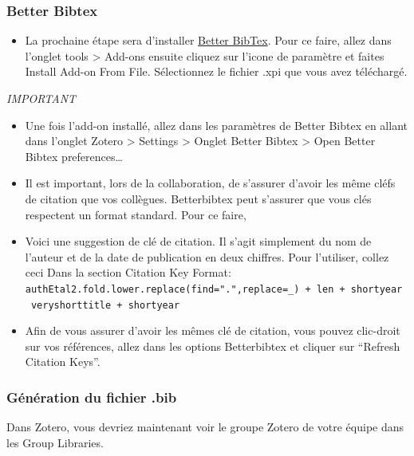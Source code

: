 \documentclass[
  letterpaper,
]{scrbook}
\providecommand{\tightlist}{%
  \setlength{\itemsep}{0pt}\setlength{\parskip}{0pt}}\usepackage{longtable,booktabs,array}
\begin{document}
\hypertarget{better-bibtex}{%
\subsubsection{Better Bibtex}\label{better-bibtex}}

\begin{itemize}
\tightlist
\item
  La prochaine étape sera d'installer
  \href{https://retorque.re/zotero-better-bibtex/installation/}{Better
  BibTex}. Pour ce faire, allez dans l'onglet tools \textgreater{}
  Add-ons ensuite cliquez sur l'icone de paramètre et faites Install
  Add-on From File. Sélectionnez le fichier .xpi que vous avez
  téléchargé.
\end{itemize}

\emph{IMPORTANT}

\begin{itemize}
\item
  Une fois l'add-on installé, allez dans les paramètres de Better Bibtex
  en allant dans l'onglet Zotero \textgreater{} Settings \textgreater{}
  Onglet Better Bibtex \textgreater{} Open Better Bibtex
  preferences\ldots{}
\item
  Il est important, lors de la collaboration, de s'assurer d'avoir les
  même cléfs de citation que vos collègues. Betterbibtex peut s'assurer
  que vous clés respectent un format standard. Pour ce faire,
\item
  Voici une suggestion de clé de citation. Il s'agit simplement du nom
  de l'auteur et de la date de publication en deux chiffres. Pour
  l'utiliser, collez ceci Dans la section Citation Key Format:
  \texttt{authEtal2.fold.lower.replace(find=".",replace=\_)\ +\ len\ +\ shortyear\ \textbar{}\ veryshorttitle\ +\ shortyear}
\item
  Afin de vous assurer d'avoir les mêmes clé de citation, vous pouvez
  clic-droit sur vos références, allez dans les options Betterbibtex et
  cliquer sur ``Refresh Citation Keys''.
\end{itemize}

\hypertarget{guxe9nuxe9ration-du-fichier-.bib}{%
\subsubsection{Génération du fichier
.bib}\label{guxe9nuxe9ration-du-fichier-.bib}}

Dans Zotero, vous devriez maintenant voir le groupe Zotero de votre
équipe dans les Group Libraries.
\end{document}
